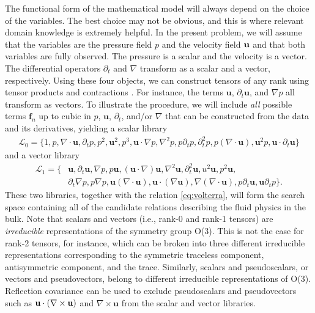 \documentclass[preprint]{article}
\def\bi#1{\textbf{#1}}
\begin{document}
The functional form of the mathematical model will always depend on the choice of the variables. The best choice may not be obvious, and this is where relevant domain knowledge is extremely helpful. In the present problem, we will assume that the variables are the pressure field $p$ and the velocity field ${\bf u}$ and that both variables are fully observed. The pressure is a scalar and the velocity is a vector. The differential operators $\partial_t$ and $\nabla$ transform as a scalar and a vector, respectively. Using these four objects, we can construct tensors of any rank using tensor products and contractions \citep{golden2023}. For instance, the terms ${\bi u}$, $\partial_t{\bi u}$, and $\nabla p$ all transform as vectors. To illustrate the procedure, we will include {\it all} possible terms ${\bi f}_n$ up to cubic in $p$, ${\bi u}$, $\partial_t$, and/or $\nabla$ that can be constructed from the data and its derivatives, yielding a scalar library
\begin{equation}
\begin{aligned}
\mathcal{L}_0=\{1,p,\nabla\cdot{\bi u},\partial_t p,p^2,{\bi u}^2, p^3, {\bi u}\cdot\nabla p,\nabla^2p,
p\partial_tp,\partial^2_tp,p(\nabla\cdot {\bi u}),{\bi u}^2p,{\bi u}\cdot\partial_t{\bi u}\}
\label{eq:rank0}
\end{aligned}
\end{equation}
and a vector library
\begin{equation}
\begin{aligned}
\mathcal{L}_1=\{&{\bi u},\partial_t{\bi u},\nabla p,p{\bi u},({\bi u}\cdot\nabla){\bi u},\nabla^2{\bi u},\partial^2_t{\bi u},u^2{\bi u},p^2{\bi u},\\
&\partial_t \nabla p, p\nabla p,{\bi u}(\nabla\cdot{\bi u}),
{\bi u}\cdot(\nabla{\bi u}),%
\nabla(\nabla\cdot{\bi u}),p \partial_t {\bi u},{\bi u} \partial_t p\}.
\label{eq:rank1}
\end{aligned}
\end{equation}
These two libraries, together with the relation \eqref{eq:volterra}, will form the search space containing all of the candidate relations describing the fluid physics in the bulk. Note that scalars and vectors (i.e., rank-0 and rank-1 tensors) are {\it irreducible} representations of the symmetry group O(3). This is not the case for rank-2 tensors, for instance, which can be broken into three different irreducible representations corresponding to the symmetric traceless component, antisymmetric component, and the trace. Similarly, scalars and pseudoscalars, or vectors and pseudovectors,  belong to different irreducible representations of O(3). Reflection covariance can be used to exclude pseudoscalars and pseudovectors such as ${\bf u} \cdot (\nabla \times {\bf u})$ and $\nabla\times{\bi u}$ from the scalar and vector libraries.
\end{document}
